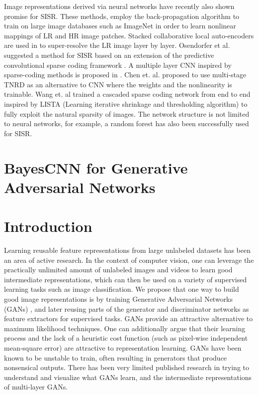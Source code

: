 Image representations derived via neural networks \cite{krizhevsky2012imagenet,zeiler2014visualizing,simonyan2014very} have recently also shown promise for \ac{SISR}. These methods, employ the back-propagation algorithm \cite{le1990handwritten} to train on large image databases such as ImageNet \cite{russakovsky2014imagenet} in order to learn nonlinear mappings of \ac{LR} and \ac{HR} image patches. Stacked collaborative local auto-encoders are used in \cite{cui2014deep} to  super-resolve the \ac{LR} image layer by layer. Osendorfer et al. \cite{osendorfer2014image} suggested a method for \ac{SISR} based on an extension of the predictive convolutional sparse coding framework \cite{poultney2006efficient}. A multiple layer \ac{CNN} inspired by sparse-coding methods is proposed in \cite{dong2015image}. Chen et. al. \cite{chen2015trainable} proposed to use multi-stage \ac{TNRD} as an alternative to \ac{CNN} where the weights and the nonlinearity is trainable. Wang et. al \cite{wang2015deeply} trained a cascaded sparse coding network from end to end inspired by LISTA (Learning iterative shrinkage and thresholding algorithm) \cite{gregor2010learning} to fully exploit the natural sparsity of images. The network structure is not limited to neural networks, for example, a random forest \cite{schulter2015fast} has also been successfully used for \ac{SISR}.

\section{BayesCNN for Generative Adversarial Networks}

\section{Introduction}

Learning reusable feature representations from large unlabeled datasets has been an area of active research. In the context of computer vision, one can leverage the practically unlimited amount of unlabeled images and videos to learn good intermediate representations, which can then be used on a variety of supervised learning tasks such as image classification. We propose that one way to build good image representations is by training Generative Adversarial Networks (GANs) \citep{Goodfellow2014}, and later reusing parts of the generator and discriminator networks as feature extractors for supervised tasks. GANs provide an attractive alternative to maximum likelihood techniques. One can additionally argue that their learning process and the lack of a heuristic cost function (such as pixel-wise independent mean-square error) are attractive to representation learning. GANs have been known to be unstable to train, often resulting in generators that produce nonsensical outputs. There has been very limited published research in trying to understand and visualize what GANs learn, and the intermediate representations of multi-layer GANs.


